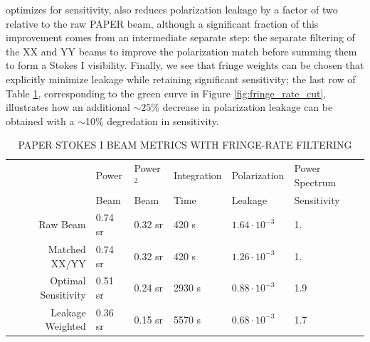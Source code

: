 \documentclass[twocolumn,apj,numberedappendix]{emulateapj}
\begin{document}
optimizes for sensitivity, also reduces polarization leakage by a factor of two relative to the
raw PAPER beam, although a significant fraction of this improvement comes from an intermediate
separate step: the separate filtering of the XX and YY beams to improve the polarization
match before summing them to form a Stokes I visibility.  Finally, we see that fringe weights can be
chosen that explicitly
minimize leakage while retaining significant sensitivity; the last row of Table \ref{tbl:beam_metrics},
corresponding to the green curve in Figure \ref{fig:fringe_rate_cut}, illustrates how an additional
$\sim25$\% decrease in polarization leakage can be obtained with a $\sim$10\% degredation
in sensitivity.


\begin{table}[ht]
\caption{PAPER STOKES I BEAM METRICS WITH FRINGE-RATE FILTERING}
\begin{center}
\begin{tabular}{rlllll}
& Power & Power$^2$ & Integration& Polarization & Power Spectrum\\
& Beam & Beam & Time & Leakage & Sensitivity\\
\hline
Raw Beam & 0.74 sr & 0.32 sr & 420 s & $1.64\cdot10^{-3}$  & 1. \\
Matched XX/YY & 0.74 sr & 0.32 sr & 420 s & $1.26\cdot10^{-3}$ & 1. \\
Optimal Sensitivity & 0.51 sr & 0.24 sr & 2930 s & $0.88\cdot10^{-3}$ & 1.9\\ %
Leakage Weighted & 0.36 sr & 0.15 sr & 5570 s & $0.68\cdot10^{-3}$ & 1.7 \\
\end{tabular}
\end{center}
\label{tbl:beam_metrics}
\end{table}%
\end{document}
